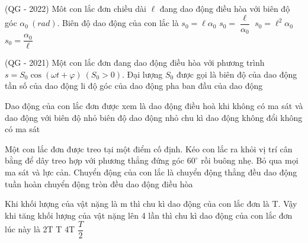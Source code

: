 \setcounter{ex}{0}
\setcounter{paragraph}{0}
\PhanI
\begin{ex} 
(QG - 2022) Môt con lắc đơn chiều dài $\ell $ đang dao động điều hòa với biên độ góc $\alpha_0\ (rad) $. Biên độ dao động của con lắc là
\choice
{\True $s_0=\ell \alpha_0$}
{$s_0=\dfrac{\ell}{\alpha_0}$}
{$s_0=\ell^2\alpha_0$}
{$s_0=\dfrac{\alpha_0}{\ell}$}
\end{ex} 
\begin{ex}
(QG - 2021) Một con lắc đơn đang dao động điều hòa với phương trình $s = S_0\cos(\omega t + \varphi)\ (S_0> 0)$. Đại lượng $S_0$ được gọi là
\choice
{\True biên độ của dao động}
{tần số của dao động}
{li độ góc của dao động}
{pha ban đầu của dao động}
\end{ex} 




\begin{ex} %
Dao động của con lắc đơn được xem là dao động điều hoà khi
\choice
{\True không có ma sát và dao động với biên độ nhỏ}
{biên độ dao động nhỏ}
{chu kì dao động không đổi}
{không có ma sát}
\end{ex} 
\begin{ex} %
Một con lắc đơn được treo tại một điểm cố định. Kéo con lắc ra khỏi vị trí cân bằng để dây treo hợp với phương thẳng đứng góc $60^\circ$ rồi buông nhẹ. Bỏ qua mọi ma sát và lực cản. Chuyển động của con lắc là
\choice
{chuyển động thẳng đều}
{\True dao động tuần hoàn}
{chuyển động tròn đều}
{dao động điều hòa}
\end{ex} 


\begin{ex} %
Khi khối lượng của vật nặng là m thì chu kì dao động của con lắc đơn là T. Vậy khi tăng khối lượng của vật nặng lên 4 lần thì chu kì dao động của con lắc đơn lúc này là
\choice
{2T}
{\True T}
{4T}
{$\dfrac{T}{2}$}
\end{ex} 

